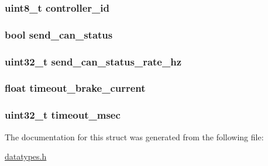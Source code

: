 \subsubsection[{controller\+\_\+id}]{\setlength{\rightskip}{0pt plus 5cm}uint8\+\_\+t controller\+\_\+id}\label{structapp__configuration_a717df0c5daa0a9d46bb055c05a3f7f8d}
\hypertarget{structapp__configuration_a836945654c96862d15e0d6c60c386524}{}
\subsubsection[{send\+\_\+can\+\_\+status}]{\setlength{\rightskip}{0pt plus 5cm}bool send\+\_\+can\+\_\+status}\label{structapp__configuration_a836945654c96862d15e0d6c60c386524}
\hypertarget{structapp__configuration_ab07c6709ecea9b0050dc9715a9b6691c}{}
\subsubsection[{send\+\_\+can\+\_\+status\+\_\+rate\+\_\+hz}]{\setlength{\rightskip}{0pt plus 5cm}uint32\+\_\+t send\+\_\+can\+\_\+status\+\_\+rate\+\_\+hz}\label{structapp__configuration_ab07c6709ecea9b0050dc9715a9b6691c}
\hypertarget{structapp__configuration_a9181ad14758fc2144ab3fa47b6018f43}{}
\subsubsection[{timeout\+\_\+brake\+\_\+current}]{\setlength{\rightskip}{0pt plus 5cm}float timeout\+\_\+brake\+\_\+current}\label{structapp__configuration_a9181ad14758fc2144ab3fa47b6018f43}
\hypertarget{structapp__configuration_a683fbd7162eec3313289bc266a921260}{}
\subsubsection[{timeout\+\_\+msec}]{\setlength{\rightskip}{0pt plus 5cm}uint32\+\_\+t timeout\+\_\+msec}\label{structapp__configuration_a683fbd7162eec3313289bc266a921260}


The documentation for this struct was generated from the following file\+:\begin{DoxyCompactItemize}
\item 
\hyperlink{datatypes_8h}{datatypes.\+h}\end{DoxyCompactItemize}
